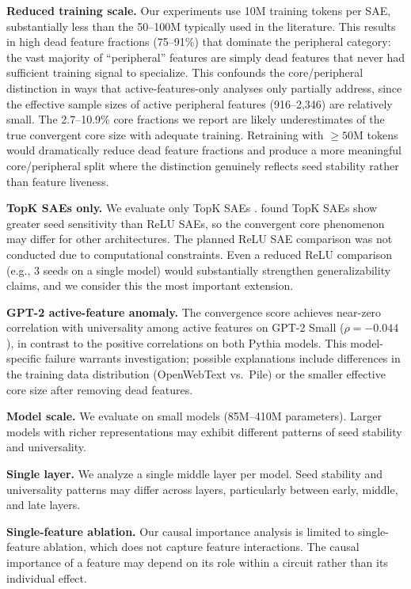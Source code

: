 \documentclass[final]{article}
\begin{document}
\textbf{Reduced training scale.} Our experiments use 10M training tokens per SAE, substantially less than the 50--100M typically used in the literature. This results in high dead feature fractions (75--91\%) that dominate the peripheral category: the vast majority of ``peripheral'' features are simply dead features that never had sufficient training signal to specialize. This confounds the core/peripheral distinction in ways that active-features-only analyses only partially address, since the effective sample sizes of active peripheral features (916--2{,}346) are relatively small. The 2.7--10.9\% core fractions we report are likely underestimates of the true convergent core size with adequate training. Retraining with ${\geq}50$M tokens would dramatically reduce dead feature fractions and produce a more meaningful core/peripheral split where the distinction genuinely reflects seed stability rather than feature liveness.

\textbf{TopK SAEs only.} We evaluate only TopK SAEs \citep{gao2024scaling}. \citet{paulo2025sparse} found TopK SAEs show greater seed sensitivity than ReLU SAEs, so the convergent core phenomenon may differ for other architectures. The planned ReLU SAE comparison was not conducted due to computational constraints. Even a reduced ReLU comparison (e.g., 3 seeds on a single model) would substantially strengthen generalizability claims, and we consider this the most important extension.

\textbf{GPT-2 active-feature anomaly.} The convergence score achieves near-zero correlation with universality among active features on GPT-2 Small ($\rho = -0.044$), in contrast to the positive correlations on both Pythia models. This model-specific failure warrants investigation; possible explanations include differences in the training data distribution (OpenWebText vs.\ Pile) or the smaller effective core size after removing dead features.

\textbf{Model scale.} We evaluate on small models (85M--410M parameters). Larger models with richer representations may exhibit different patterns of seed stability and universality.

\textbf{Single layer.} We analyze a single middle layer per model. Seed stability and universality patterns may differ across layers, particularly between early, middle, and late layers.

\textbf{Single-feature ablation.} Our causal importance analysis is limited to single-feature ablation, which does not capture feature interactions. The causal importance of a feature may depend on its role within a circuit rather than its individual effect.
\end{document}
